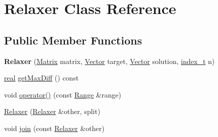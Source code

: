 \hypertarget{class_relaxer}{
\section{Relaxer Class Reference}
\label{class_relaxer}
}
\subsection*{Public Member Functions}
\begin{CompactItemize}
\item 
\hypertarget{class_relaxer_7867f2f26839f9faaa150b4d0ea180fa}{
\textbf{Relaxer} (\hyperlink{cowichan_8hpp_3fb46f939e55c239fbc95656fc0f3399}{Matrix} matrix, \hyperlink{cowichan_8hpp_02bc1553e241b9b33408482658b3c355}{Vector} target, \hyperlink{cowichan_8hpp_02bc1553e241b9b33408482658b3c355}{Vector} solution, \hyperlink{cowichan_8hpp_5b04577d5d21124855deaad298595371}{index\_\-t} n)}
\label{class_relaxer_7867f2f26839f9faaa150b4d0ea180fa}

\item 
\hyperlink{cowichan_8hpp_4d521b2c54a1f6312cc8fa04827eaf98}{real} \hyperlink{class_relaxer_6b4b0383b11cfdc6fc48ec7e137e688d}{getMaxDiff} () const 
\item 
void \hyperlink{class_relaxer_bbcc97706ee506fb14f822fe8ae57ee9}{operator()} (const \hyperlink{cowichan__tbb_8hpp_8e2057f725b08f3a15513c378a453a47}{Range} \&range)
\item 
\hyperlink{class_relaxer_34cd0a0220031f4ec6ab21dbcf9a9970}{Relaxer} (\hyperlink{class_relaxer}{Relaxer} \&other, split)
\item 
void \hyperlink{class_relaxer_521cb3709f2af24b307114d016b2cd44}{join} (const \hyperlink{class_relaxer}{Relaxer} \&other)
\end{CompactItemize}
